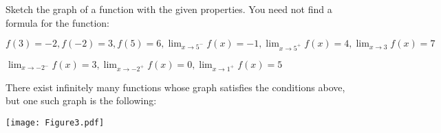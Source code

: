 \message{ !name(limitLaws.tex)}\documentclass[handout,nooutcomes]{ximera}
\begin{document}
	
	
	
	
	
	
	
	
\begin{problem}
Sketch the graph of a function with the given properties.  You need not find a formula for the function:
	
	$ f(3) = -2, f(-2) = 3, f(5) = 6, \lim_{x \to 5^-} f(x) = -1, \lim_{x \to 5^+} f(x) = 4, \lim_{x \to 3} f(x) = 7  $
	
	$ \lim_{x \to -2^-} f(x) = 3, \lim_{x \to -2^+} f(x) = 0, \lim_{x \to 1^+} f(x) = 5  $
	
	\begin{freeResponse}
	There exist infinitely many functions whose graph satisfies the conditions above, but one such graph is the following:
	
\newpage
	
		\begin{image}
		\texttt{[image: Figure3.pdf]}
		\end{image}
	\end{freeResponse}
\end{problem}
	










								
				
				
	
\end{document}
